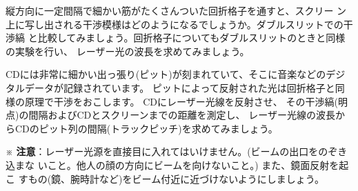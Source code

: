 \bigskip


縦方向に一定間隔で細かい筋がたくさんついた回折格子を通すと、スクリー
ン上に写し出される干渉模様はどのようになるでしょうか。ダブルスリットでの干渉縞
と比較してみましょう。回折格子についてもダブルスリットのときと同様の実験を行い、
レーザー光の波長を求めてみましょう。

\bigskip


%


CDには非常に細かい出っ張り(ピット)が刻まれていて、そこに音楽などのデジタルデータが記録されています。
ピットによって反射された光は回折格子と同様の原理で干渉をおこします。
CDにレーザー光線を反射させ、
その干渉縞(明点)の間隔およびCDとスクリーンまでの距離を測定し、
レーザー光線の波長からCDのピット列の間隔(トラックピッチ)を求めてみましょう。


\bigskip


\hspace*{-\parindent}
※ {\bf 注意}：レーザー光源を直接目に入れてはいけません。(ビームの出口をのぞき込まな
いこと。他人の顔の方向にビームを向けないこと。) また、鏡面反射を起こ
すもの(鏡、腕時計など)をビーム付近に近づけないようにしましょう。